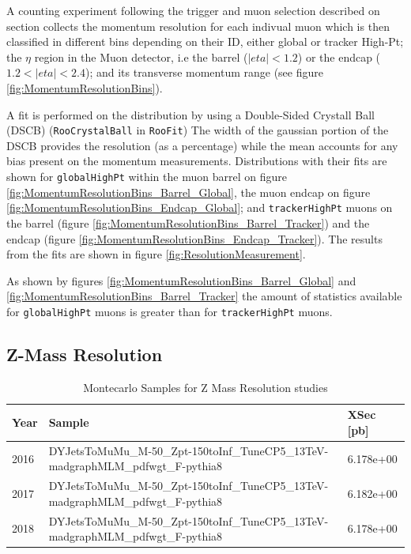 A counting experiment following the trigger and muon selection described on
section %
collects the momentum resolution for each indivual muon which is then classified
in different bins depending on their ID, either global or tracker High-Pt; the $\eta$
region in the Muon detector, i.e the barrel ($\lvert eta\lvert< 1.2$) or
the endcap ($1.2 < \lvert eta \lvert < 2.4$); and its transverse momentum range
(see figure \ref{fig:MomentumResolutionBins}).

A fit is performed on the distribution by using a Double-Sided Crystall Ball (DSCB)
(\verb|RooCrystalBall| in \verb|RooFit|)
The width of the gaussian portion of the DSCB provides the
resolution (as a percentage) while the mean accounts for any bias present on the
momentum measurements. Distributions with their fits are shown for \verb|globalHighPt|
within the muon barrel on figure \ref{fig:MomentumResolutionBins_Barrel_Global}, the muon
endcap on figure \ref{fig:MomentumResolutionBins_Endcap_Global};
and \verb|trackerHighPt| muons on the barrel
(figure \ref{fig:MomentumResolutionBins_Barrel_Tracker})
and the endcap (figure \ref{fig:MomentumResolutionBins_Endcap_Tracker}).
The results from the fits are shown in figure \ref{fig:ResolutionMeasurement}.

As shown by figures \ref{fig:MomentumResolutionBins_Barrel_Global} and
\ref{fig:MomentumResolutionBins_Barrel_Tracker} the amount of statistics
available for \verb|globalHighPt| muons is greater than for
\verb|trackerHighPt| muons. 

\subsection{Z-Mass Resolution}

\begin{table}
\begin{center}
  \caption{Montecarlo Samples for Z Mass Resolution studies}
\footnotesize
\begin{tabular}{|l|l|l|}
\hline
Year & Sample & XSec [pb] \\ \hline
\hline
2016 & DYJetsToMuMu\_M-50\_Zpt-150toInf\_TuneCP5\_13TeV-madgraphMLM\_pdfwgt\_F-pythia8 & 6.178e+00\\
\hline
2017 & DYJetsToMuMu\_M-50\_Zpt-150toInf\_TuneCP5\_13TeV-madgraphMLM\_pdfwgt\_F-pythia8 & 6.182e+00\\
\hline
2018 & DYJetsToMuMu\_M-50\_Zpt-150toInf\_TuneCP5\_13TeV-madgraphMLM\_pdfwgt\_F-pythia8 & 6.178e+00\\
\hline
\end{tabular}
\label{tab:ZMassResolutionSamples}
\end{center}
\end{table}

